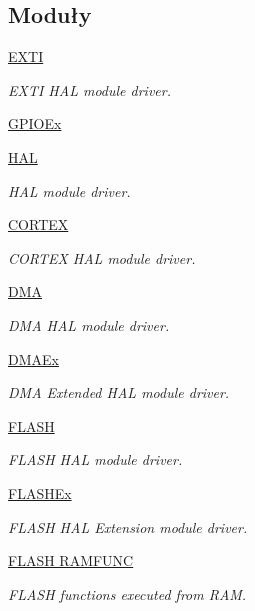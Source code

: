 \subsection*{Moduły}
\begin{DoxyCompactItemize}
\item 
\hyperlink{group___e_x_t_i}{E\+X\+TI}
\begin{DoxyCompactList}\small\item\em E\+X\+TI H\+AL module driver. \end{DoxyCompactList}\item 
\hyperlink{group___g_p_i_o_ex}{G\+P\+I\+O\+Ex}
\item 
\hyperlink{group___h_a_l}{H\+AL}
\begin{DoxyCompactList}\small\item\em H\+AL module driver. \end{DoxyCompactList}\item 
\hyperlink{group___c_o_r_t_e_x}{C\+O\+R\+T\+EX}
\begin{DoxyCompactList}\small\item\em C\+O\+R\+T\+EX H\+AL module driver. \end{DoxyCompactList}\item 
\hyperlink{group___d_m_a}{D\+MA}
\begin{DoxyCompactList}\small\item\em D\+MA H\+AL module driver. \end{DoxyCompactList}\item 
\hyperlink{group___d_m_a_ex}{D\+M\+A\+Ex}
\begin{DoxyCompactList}\small\item\em D\+MA Extended H\+AL module driver. \end{DoxyCompactList}\item 
\hyperlink{group___f_l_a_s_h}{F\+L\+A\+SH}
\begin{DoxyCompactList}\small\item\em F\+L\+A\+SH H\+AL module driver. \end{DoxyCompactList}\item 
\hyperlink{group___f_l_a_s_h_ex}{F\+L\+A\+S\+H\+Ex}
\begin{DoxyCompactList}\small\item\em F\+L\+A\+SH H\+AL Extension module driver. \end{DoxyCompactList}\item 
\hyperlink{group___f_l_a_s_h___r_a_m_f_u_n_c}{F\+L\+A\+S\+H R\+A\+M\+F\+U\+NC}
\begin{DoxyCompactList}\small\item\em F\+L\+A\+SH functions executed from R\+AM. \end{DoxyCompactList}\item 

\end{DoxyCompactItemize}
